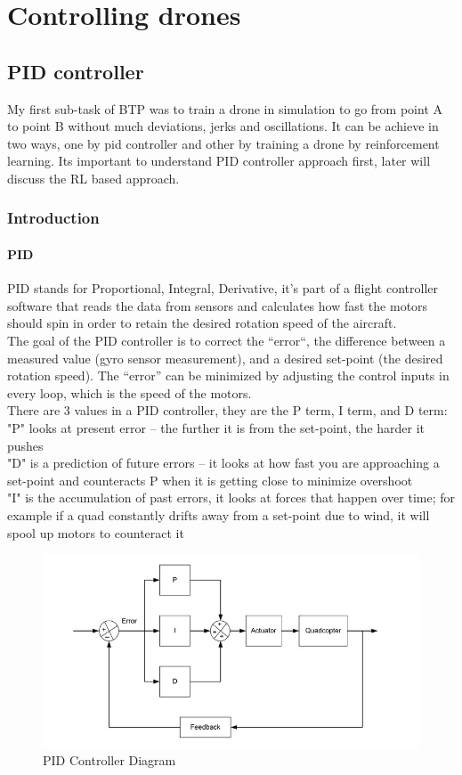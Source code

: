 \chapter{Controlling drones}

\section{PID controller}
My first sub-task of BTP was to train a drone in simulation to go from point A to point B without much deviations, jerks and oscillations.
It can be achieve in two ways, one by pid controller and other by training a drone by reinforcement learning. 
Its important to understand PID controller approach first, later will discuss the RL based approach.
\subsection{Introduction}
\subsubsection{PID}
PID stands for Proportional, Integral, Derivative, it’s part of a flight controller software that reads the data from sensors and calculates how fast the motors should spin in order to retain the desired rotation speed of the aircraft.\cite{pidwiki}
\\
The goal of the PID controller is to correct the “error“, the difference between a measured value (gyro sensor measurement), and a desired set-point (the desired rotation speed). The “error” can be minimized by adjusting the control inputs in every loop, which is the speed of the motors.\cite{pid}
\\
There are 3 values in a PID controller, they are the P term, I term, and D term:
\\
"P" looks at present error –  the further it is from the set-point, the harder it pushes
\\"D" is a prediction of future errors – it looks at how fast you are approaching a set-point and counteracts P when it is getting close to minimize overshoot
\\"I" is the accumulation of past errors, it looks at forces that happen over time; for example if a quad constantly drifts away from a set-point due to wind, it will spool up motors to counteract it
\\
\begin{figure}[H]
    \centering
    \includegraphics[width=\textwidth]{images/pid.png}
    \caption{PID Controller Diagram}
\end{figure}

